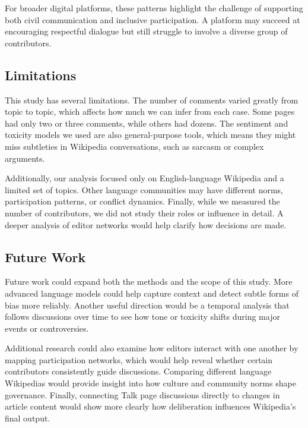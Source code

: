 For broader digital platforms, these patterns highlight the challenge
of supporting both civil communication and inclusive participation.
A platform may succeed at encouraging respectful dialogue but still
struggle to involve a diverse group of contributors.

\subsection{Limitations}
This study has several limitations. The number of comments varied
greatly from topic to topic, which affects how much we can infer
from each case. Some pages had only two or three comments, while
others had dozens. The sentiment and toxicity models we used are
also general-purpose tools, which means they might miss subtleties
in Wikipedia conversations, such as sarcasm or complex arguments.

Additionally, our analysis focused only on English-language
Wikipedia and a limited set of topics. Other language communities
may have different norms, participation patterns, or conflict
dynamics. Finally, while we measured the number of contributors,
we did not study their roles or influence in detail. A deeper analysis
of editor networks would help clarify how decisions are made.

\subsection{Future Work}
Future work could expand both the methods and the scope of this
study. More advanced language models could help capture context
and detect subtle forms of bias more reliably. Another useful
direction would be a temporal analysis that follows discussions over
time to see how tone or toxicity shifts during major events or
controversies.

Additional research could also examine how editors interact with
one another by mapping participation networks, which would help
reveal whether certain contributors consistently guide discussions.
Comparing different language Wikipedias would provide insight into
how culture and community norms shape governance. Finally,
connecting Talk page discussions directly to changes in article
content would show more clearly how deliberation influences
Wikipedia’s final output.

